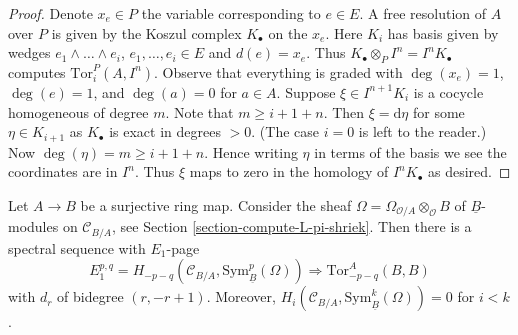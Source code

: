 \begin{proof}
Denote $x_e \in P$ the variable corresponding to $e \in E$.
A free resolution of $A$ over $P$ is given by the Koszul complex
$K_\bullet$ on the $x_e$. Here $K_i$ has basis given by wedges
$e_1 \wedge \ldots \wedge e_i$, $e_1, \ldots, e_i \in E$ and $d(e) = x_e$.
Thus $K_\bullet \otimes_P I^n = I^nK_\bullet$ computes
$\text{Tor}_i^P(A, I^n)$. Observe that everything is graded
with $\deg(x_e) = 1$, $\deg(e) = 1$, and $\deg(a) = 0$ for $a \in A$.
Suppose $\xi \in I^{n + 1}K_i$ is a cocycle homogeneous of degree $m$.
Note that $m \geq i + 1 + n$. Then $\xi = \text{d}\eta$ for some
$\eta \in K_{i + 1}$ as $K_\bullet$ is exact in degrees $ > 0$.
(The case $i = 0$ is left to the reader.)
Now $\deg(\eta) = m \geq i + 1 + n$. Hence writing $\eta$
in terms of the basis we see the coordinates are in $I^n$.
Thus $\xi$ maps to zero in the homology of $I^nK_\bullet$ as desired.
\end{proof}

\begin{theorem}
\label{theorem-quillen-spectral-sequence}
Let $A \to B$ be a surjective ring map. Consider the sheaf
$\Omega = \Omega_{\mathcal{O}/A} \otimes_\mathcal{O} B$ of
$\underline{B}$-modules on $\mathcal{C}_{B/A}$, see
Section \ref{section-compute-L-pi-shriek}.
Then there is a spectral sequence with $E_1$-page
$$
E_1^{p, q} =
H_{- p - q}(\mathcal{C}_{B/A}, \text{Sym}^p_{\underline{B}}(\Omega))
\Rightarrow \text{Tor}^A_{- p - q}(B, B)
$$
with $d_r$ of bidegree $(r, -r + 1)$.
Moreover, $H_i(\mathcal{C}_{B/A}, \text{Sym}^k_{\underline{B}}(\Omega)) = 0$
for $i < k$.
\end{theorem}

